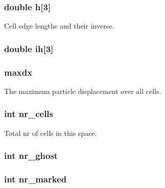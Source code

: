 \hypertarget{structspace_a98c9ffdf27710977bcfc00488fa9727c}{
\subsubsection[{h}]{\setlength{\rightskip}{0pt plus 5cm}double h\mbox{[}3\mbox{]}}}\label{structspace_a98c9ffdf27710977bcfc00488fa9727c}
Cell edge lengths and their inverse. \hypertarget{structspace_ac7c56c7d8f3b0a41e13e2656e22afe37}{
\subsubsection[{ih}]{\setlength{\rightskip}{0pt plus 5cm}double ih\mbox{[}3\mbox{]}}}\label{structspace_ac7c56c7d8f3b0a41e13e2656e22afe37}
\hypertarget{structspace_af95a2d78a1e550c6602480b8afb4d9ff}{
\subsubsection[{maxdx}]{ maxdx}}\label{structspace_af95a2d78a1e550c6602480b8afb4d9ff}
The maximum particle displacement over all cells. \hypertarget{structspace_aa6e3b6f5feb3d1004ca3803fb6bfa6dd}{
\subsubsection[{nr\-\_\-cells}]{\setlength{\rightskip}{0pt plus 5cm}int nr\-\_\-cells}}\label{structspace_aa6e3b6f5feb3d1004ca3803fb6bfa6dd}
Total nr of cells in this space. \hypertarget{structspace_a2ba1ca0768f11c20f4581eff56bc3f95}{
\subsubsection[{nr\-\_\-ghost}]{\setlength{\rightskip}{0pt plus 5cm}int nr\-\_\-ghost}}\label{structspace_a2ba1ca0768f11c20f4581eff56bc3f95}
\hypertarget{structspace_abb0eaf746daf1a24f0844a5312bc108a}{
\subsubsection[{nr\-\_\-marked}]{\setlength{\rightskip}{0pt plus 5cm}int nr\-\_\-marked}}\label{structspace_abb0eaf746daf1a24f0844a5312bc108a}
